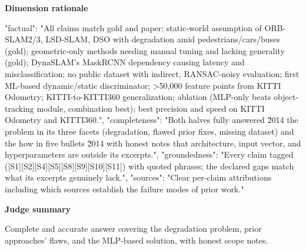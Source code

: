 \documentclass[10pt]{article}
\begin{document}
\textbf{Dimension rationale}
\begin{EvidenceText}
{
  "factual": "All claims match gold and paper: static-world assumption of ORB-SLAM2/3, LSD-SLAM, DSO with degradation amid pedestrians/cars/buses (gold); geometric-only methods needing manual tuning and lacking generality (gold); DynaSLAM's MaskRCNN dependency causing latency and misclassification; no public dataset with indirect, RANSAC-noisy evaluation; first ML-based dynamic/static discriminator; >50,000 feature points from KITTI Odometry; KITTI-to-KITTI360 generalization; ablation (MLP-only beats object-tracking module, combination best); best precision and speed on KITTI Odometry and KITTI360.",
  "completeness": "Both halves fully answered \u2014 the problem in its three facets (degradation, flawed prior fixes, missing dataset) and the how in five bullets \u2014 with honest notes that architecture, input vector, and hyperparameters are outside its excerpts.",
  "groundedness": "Every claim tagged ([S1][S2][S4][S5][S8][S9][S10][S11]) with quoted phrases; the declared gaps match what its excerpts genuinely lack.",
  "sources": "Clear per-claim attributions including which sources establish the failure modes of prior work."
}
\end{EvidenceText}

\textbf{Judge summary}
\begin{EvidenceText}
Complete and accurate answer covering the degradation problem, prior approaches' flaws, and the MLP-based solution, with honest scope notes.
\end{EvidenceText}
\end{document}
